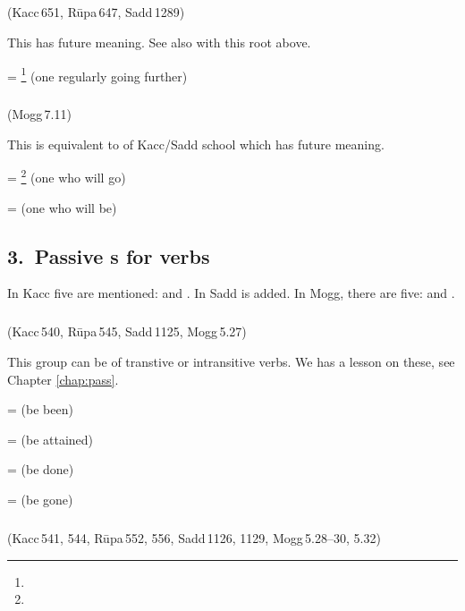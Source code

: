 \subparagraph*{} (Kacc\,651, R\=upa\,647, Sadd\,1289)\label{pacck2:ghidn}

This  has future meaning. See also  with this root above.

 = \footnote{} (one regularly going further)\par

\subparagraph*{} (Mogg\,7.11)\label{pacck2:iidna}

This is equivalent to  of Kacc/Sadd school which has future meaning.

 = \footnote{} (one who will go)\par
{} =  (one who will be)\par

\subsection*{3.\ Passive s for verbs}\label{kita:group3}\label{par:passpaccaya}

In Kacc five are mentioned:  and . In Sadd  is added. In Mogg, there are five:  and .

\subparagraph*{} (Kacc\,540, R\=upa\,545, Sadd\,1125, Mogg\,5.27)\label{pacck3:tabba}\label{pacck3:aniiya}

This group can be of transtive or intransitive verbs. We has a lesson on these, see Chapter \ref{chap:pass}.

 =  (be been)\par
{} =  (be attained)\par
{} =  (be done)\par
{} =  (be gone)\par

\subparagraph*{} (Kacc\,541, 544, R\=upa\,552, 556, Sadd\,1126, 1129, Mogg\,5.28--30, 5.32)\label{pacck3:dnya}\label{pacck3:teyya}\label{pacck3:ghyadna}\label{pacck3:ya1}\label{pacck3:yaka}

